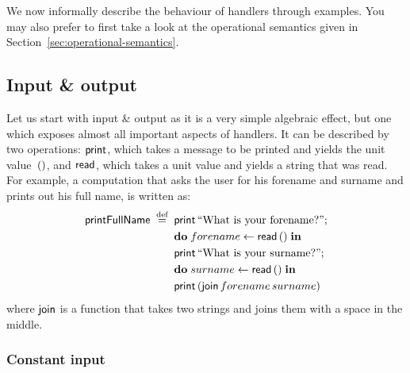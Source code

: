 \documentclass{article}
\begin{document}
We now informally describe the behaviour of handlers through examples. You may
also prefer to first take a look at the operational semantics given in
Section~\ref{sec:operational-semantics}.

\subsection{Input \& output}

Let us start with input \& output as it is a very simple algebraic effect, but
one which exposes almost all important aspects of handlers. It can be described
by two operations: $\mathsf{print}$, which takes a message to be printed and yields
the unit value~$\mathbf{()}$, and $\mathsf{read}$, which takes a unit value and yields a
string that was read. For example, a computation that asks the user for his
forename and surname and prints out his full name, is written as:
%
\begin{align*}
  \mathord{\mathsf{printFullName}} \mathrel{\;\stackrel{\text{def}}{=}\;} {}
    & \mathsf{print} \, \mathord{\text{``What is your forename?''}}; \\
    & \mathbf{do}\; forename \leftarrow \mathsf{read} \, \mathbf{()} \;\mathbf{in}\; \\
    & \mathsf{print} \, \mathord{\text{``What is your surname?''}}; \\
    & \mathbf{do}\; surname \leftarrow \mathsf{read} \, \mathbf{()} \;\mathbf{in}\; \\
    & \mathsf{print} \, (\mathord{\mathsf{join}} \, forename \, surname)
\end{align*}
%
where $\mathord{\mathsf{join}}$ is a function that takes two strings and joins them with a
space in the middle.

\subsubsection{Constant input}
\end{document}
